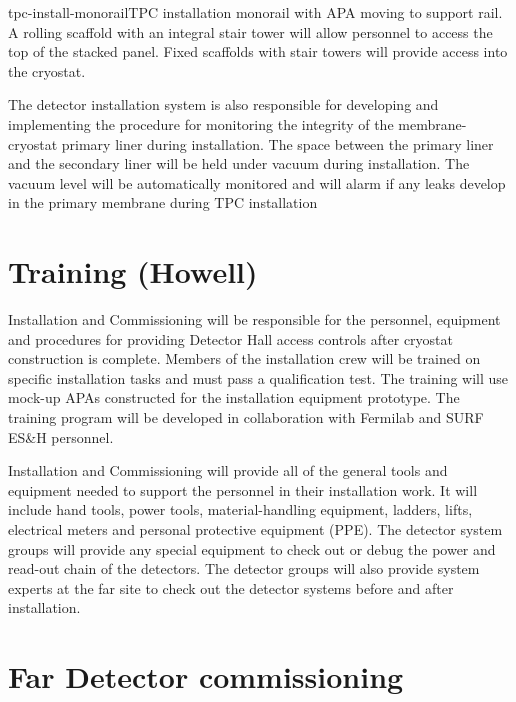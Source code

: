 
\begin{cdrfigure}{tpc-install-monorail}{TPC installation monorail with APA moving to support rail. A rolling scaffold with an integral stair tower will allow personnel to access the top of the stacked panel. Fixed scaffolds with stair towers will provide access into the cryostat.}
\end{cdrfigure}

The detector installation system is also responsible for developing and implementing the procedure for monitoring the integrity of the membrane-cryostat primary liner during installation. The space between the 
primary liner and the secondary liner will be held under vacuum during installation. The vacuum level will be automatically monitored and will alarm if any leaks develop in the primary membrane during TPC installation

\section{Training (Howell)}
\label{fd:install:training}

Installation and Commissioning will be responsible for the personnel, equipment and procedures for providing Detector Hall access controls after cryostat construction is complete. Members of the installation crew will be 
trained on specific installation tasks and must pass a qualification test. The training will use mock-up APAs constructed for the installation equipment prototype. The training program will be developed in collaboration with Fermilab and SURF ES\&H personnel. 

Installation and Commissioning will provide all of the general tools and equipment needed to support the personnel in their installation work. It will include hand tools, power tools, material-handling equipment, ladders, 
lifts, electrical meters and personal protective equipment (PPE). The detector system groups will provide any special equipment to check out or debug the power and read-out chain of the detectors. The detector groups will also provide system experts at the far site to check out the detector systems before and after installation. 

\section{Far Detector commissioning}
\label{fd:install:commissioning}

